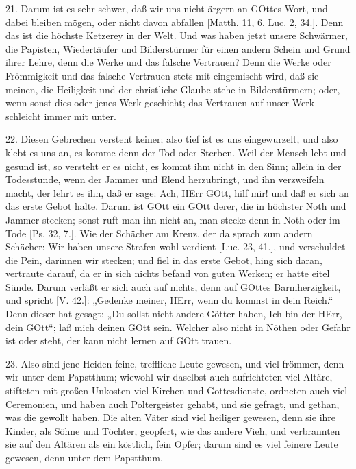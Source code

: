 21. Darum ist es sehr schwer, daß wir uns nicht ärgern an GOttes Wort, und dabei bleiben mögen, oder nicht davon abfallen [Matth. 11, 6. Luc. 2, 34.]. Denn das ist die höchste Ketzerey in der Welt. Und was haben jetzt unsere Schwärmer, die Papisten, Wiedertäufer und Bilderstürmer für einen andern Schein und Grund ihrer Lehre, denn die Werke und das falsche Vertrauen? Denn die Werke oder Frömmigkeit und das falsche Vertrauen stets mit eingemischt wird, daß sie meinen, die Heiligkeit und der christliche Glaube stehe in Bilderstürmern; oder, wenn sonst dies oder jenes Werk geschieht; das Vertrauen auf unser Werk schleicht immer mit unter.

22. Diesen Gebrechen versteht keiner; also tief ist es uns eingewurzelt, und also klebt es uns an, es komme denn der Tod oder Sterben. Weil der Mensch lebt und gesund ist, so versteht er es nicht, es kommt ihm nicht in den Sinn; allein in der Todesstunde, wenn der Jammer und Elend herzubringt, und ihn verzweifeln macht, der lehrt es ihn, daß er sage: Ach, HErr GOtt, hilf mir! und daß er sich an das erste Gebot halte. Darum ist GOtt ein GOtt derer, die in höchster Noth und Jammer stecken; sonst ruft man ihn nicht an, man stecke denn in Noth oder im Tode [Ps. 32, 7.]. Wie der Schächer am Kreuz, der da sprach zum andern Schächer: Wir haben unsere Strafen wohl verdient [Luc. 23, 41.], und verschuldet die Pein, darinnen wir stecken; und fiel in das erste Gebot, hing sich daran, vertraute darauf, da er in sich nichts befand von guten Werken; er hatte eitel Sünde. Darum verläßt er sich auch auf nichts, denn auf GOttes Barmherzigkeit, und spricht [V. 42.]: „Gedenke meiner, HErr, wenn du kommst in dein Reich.“ Denn dieser hat gesagt: „Du sollst nicht andere Götter haben, Ich bin der HErr, dein GOtt“; laß mich deinen GOtt sein. Welcher also nicht in Nöthen oder Gefahr ist oder steht, der kann nicht lernen auf GOtt trauen.

23. Also sind jene Heiden feine, treffliche Leute gewesen, und viel frömmer, denn wir unter dem Papstthum; wiewohl wir daselbst auch aufrichteten viel Altäre, stifteten mit großen Unkosten viel Kirchen und Gottesdienste, ordneten
auch viel Ceremonien, und haben auch Poltergeister gehabt, und sie gefragt, und gethan, was die gewollt haben. Die alten Väter sind viel heiliger gewesen, denn sie ihre Kinder, als Söhne und Töchter, geopfert, wie das andere Vieh, und verbrannten sie auf den Altären als ein köstlich, fein Opfer; darum sind es viel feinere Leute gewesen, denn unter dem Papstthum.

